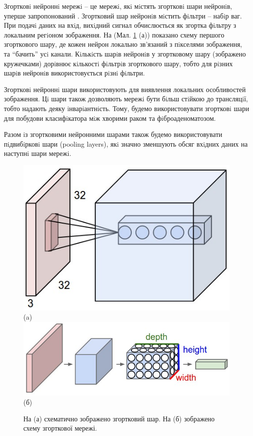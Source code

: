 Згортковi нейроннi мережi -- це мережi, якi мiстять згортковi шари нейронiв, уперше запропонований \parencite{nn:lecun_cnn}. Згортковий шар нейронiв мiстить фiльтри -- набiр ваг. При подачi даних на вхiд, вихiдний сигнал обчислюється як згортка фiльтру з локальним регiоном зображення. На (Мал. \ref{fig:convonet} (а)) показано схему першого згорткового шару, де кожен нейрон локально зв'язаний з пiкселями зображення, та \enquote{бачить} усi канали. Кiлькiсть шарiв нейронiв у згортковому шару (зображено кружечками) дорiвнює кiлькостi фiльтрiв згорткового шару, тобто для рiзних шарiв нейронiв використовується рiзнi фiльтри.

Згортковi нейроннi шари використовують для виявлення локальних особливостей зображення. Цi шари також дозволяють мережi бути бiльш стiйкою до трансляцiї, тобто надають деяку iнварiантнiсть. Тому, будемо використовувати згортковi шари для побудови класифiкатора мiж хворими раком та фiброаденоматозом.

Разом iз згортковими нейронними шарами також будемо використовувати пiдвибiрковi шари (pooling layers), якi значно зменшують обсяг вхiдних даних на наступнi шари мережi.

\begin{figure}[t!]
	\centering	
	\includegraphics[width=0.90\linewidth]{Figures/Chapter4/depthcol.jpeg}\\
	(a)
	\endminipage\hfill
	\centering	
	\includegraphics[width=0.90\linewidth]{Figures/Chapter4/cnn.jpeg}\\
	(б)
	\endminipage\hfill
	
	\caption{На (а) схематично зображено згортковий шар. На (б) зображено схему згорткової мережі.}
	\label{fig:convonet}
\end{figure}

